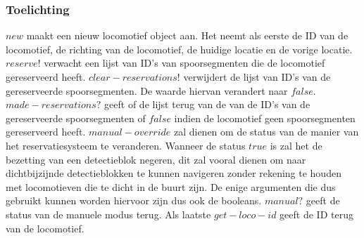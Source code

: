\documentclass{article}
\begin{document}
\subsubsection{Toelichting}
$new$ maakt een nieuw locomotief object aan. Het neemt als eerste de ID van de locomotief, de richting van de locomotief, de huidige locatie en de vorige locatie. 
$reserve!$ verwacht een lijst van ID's van spoorsegmenten die de locomotief gereserveerd heeft. $clear-reservations!$ verwijdert de lijst van ID's van de gereserveerde
spoorsegmenten. De waarde hiervan verandert naar $false$. $made-reservations?$ geeft of de lijst terug van de van de ID's van de gereserveerde spoorsegmenten of $false$ indien de 
locomotief geen spoorsegmenten gereserveerd heeft.
$manual-override$ zal dienen om de status van de manier van het reservatiesysteem te veranderen. Wanneer de status $true$ is zal het de bezetting van een detectieblok negeren, 
dit zal vooral dienen om naar dichtbijzijnde detectieblokken te kunnen navigeren zonder rekening te houden met locomotieven die te dicht in de buurt zijn. De enige argumenten
die dus gebruikt kunnen worden hiervoor zijn dus ook de booleans. 
$manual?$ geeft de status van de manuele modus terug. Als laatste $get-loco-id$ geeft de ID terug van de locomotief. 
\end{document}
